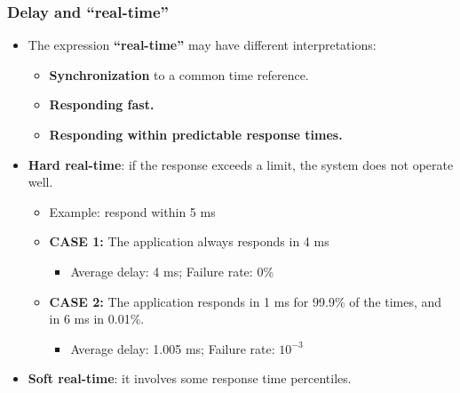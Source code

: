 \subsubsection{Delay and ``real-time''}
\begin{itemize}
    \item The expression \textbf{``real-time''} may have different interpretations:
    \begin{itemize}
        \item \textbf{Synchronization} to a common time reference.
        \item \textbf{Responding fast.}
        \item \textbf{Responding within predictable response times.}
    \end{itemize}
    
    \item \textbf{Hard real-time}: if the response exceeds a limit, the system does not operate well.
    \begin{itemize}
        \item Example: respond within 5 ms
        \item \textbf{CASE 1:} The application always responds in 4 ms
        \begin{itemize}
            \item Average delay: 4 ms; Failure rate: 0\%
        \end{itemize}
        \item \textbf{CASE 2:} The application responds in 1 ms for 99.9\% of the times, and in 6 ms in 0.01\%.
        \begin{itemize}
            \item Average delay: 1.005 ms; Failure rate: $10^{-3}$
        \end{itemize}
    \end{itemize}
    \item \textbf{Soft real-time}: it involves some response time percentiles.
\end{itemize}

